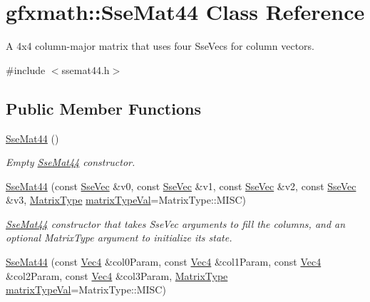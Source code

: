 \hypertarget{classgfxmath_1_1_sse_mat44}{}\section{gfxmath\+:\+:Sse\+Mat44 Class Reference}
\label{classgfxmath_1_1_sse_mat44}


A 4x4 column-\/major matrix that uses four Sse\+Vecs for column vectors.  




{\ttfamily \#include $<$ssemat44.\+h$>$}

\subsection*{Public Member Functions}
\begin{DoxyCompactItemize}
\item 
\hyperlink{classgfxmath_1_1_sse_mat44_aeee33533bcfdba675609d5b1155cf029}{Sse\+Mat44} ()
\begin{DoxyCompactList}\small\item\em Empty \hyperlink{classgfxmath_1_1_sse_mat44}{Sse\+Mat44} constructor. \end{DoxyCompactList}\item 
\hyperlink{classgfxmath_1_1_sse_mat44_a60f6b91adfec4810007c8bef96bca42c}{Sse\+Mat44} (const \hyperlink{namespacegfxmath_a0de2243e2b8d0fd46d3af5e036423004}{Sse\+Vec} \&v0, const \hyperlink{namespacegfxmath_a0de2243e2b8d0fd46d3af5e036423004}{Sse\+Vec} \&v1, const \hyperlink{namespacegfxmath_a0de2243e2b8d0fd46d3af5e036423004}{Sse\+Vec} \&v2, const \hyperlink{namespacegfxmath_a0de2243e2b8d0fd46d3af5e036423004}{Sse\+Vec} \&v3, \hyperlink{group___s_i_s_d_mat_math_ga6c8951c82aec5015dd6806affb4c8d03}{Matrix\+Type} \hyperlink{classgfxmath_1_1_sse_mat44_abdcc4efbf8375bae103da12c0823a85c}{matrix\+Type\+Val}=Matrix\+Type\+::\+M\+I\+S\+C)
\begin{DoxyCompactList}\small\item\em \hyperlink{classgfxmath_1_1_sse_mat44}{Sse\+Mat44} constructor that takes Sse\+Vec arguments to fill the columns, and an optional Matrix\+Type argument to initialize its state. \end{DoxyCompactList}\item 
\hyperlink{classgfxmath_1_1_sse_mat44_a2fe0899f1f7a864586c5fb01397da259}{Sse\+Mat44} (const \hyperlink{classgfxmath_1_1_vec4}{Vec4} \&col0\+Param, const \hyperlink{classgfxmath_1_1_vec4}{Vec4} \&col1\+Param, const \hyperlink{classgfxmath_1_1_vec4}{Vec4} \&col2\+Param, const \hyperlink{classgfxmath_1_1_vec4}{Vec4} \&col3\+Param, \hyperlink{group___s_i_s_d_mat_math_ga6c8951c82aec5015dd6806affb4c8d03}{Matrix\+Type} \hyperlink{classgfxmath_1_1_sse_mat44_abdcc4efbf8375bae103da12c0823a85c}{matrix\+Type\+Val}=Matrix\+Type\+::\+M\+I\+S\+C)

\end{DoxyCompactItemize}
